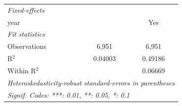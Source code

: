 \begin{tabular}{lcc}
   \midrule
   \emph{Fixed-effects}\\
   year                &                 & Yes\\  
   \midrule
   \emph{Fit statistics}\\
   Observations        & 6,951           & 6,951\\  
   R$^2$               & 0.04003         & 0.49186\\  
   Within R$^2$        &                 & 0.06669\\  
   \midrule \midrule
   \multicolumn{3}{l}{\emph{Heteroskedasticity-robust standard-errors in parentheses}}\\
   \multicolumn{3}{l}{\emph{Signif. Codes: ***: 0.01, **: 0.05, *: 0.1}}\\
\end{tabular}
\par\endgroup


